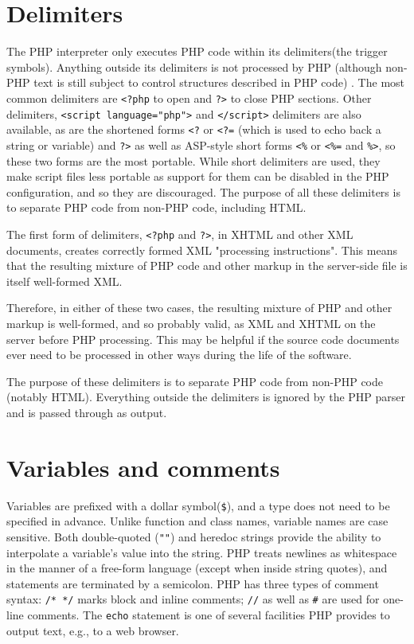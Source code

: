 \section{Delimiters}



The PHP interpreter only executes PHP code within its delimiters(the trigger symbols). Anything outside its delimiters is not processed by PHP (although non-PHP text is still subject to control structures described in PHP code) . The most common delimiters are \texttt{<?php} to open and \texttt{?>} to close PHP sections.  Other delimiters, \texttt{<script language="php">} and \texttt{</script>} delimiters are also available, as are the shortened forms \texttt{<?} or \texttt{<?=} (which is used to echo back a string or variable) and \texttt{?>} as well as ASP-style short forms \texttt{<\%} or \texttt{<\%=} and \texttt{\%>}, so these two forms are the most portable. While short delimiters are used, they make script files less portable as support for them can be disabled in the PHP configuration, and so they are discouraged. The purpose of all these delimiters is to separate PHP code from non-PHP code, including HTML.



The first form of delimiters, \texttt{<?php} and \texttt{?>}, in XHTML and other XML documents, creates correctly formed XML "processing instructions". This means that the resulting mixture of PHP code and other markup in the server-side file is itself well-formed XML.

Therefore, in either of these two cases, the resulting mixture of PHP and other markup is well-formed, and so probably valid, as XML and XHTML on the server before PHP processing. This may be helpful if the source code documents ever need to be processed in other ways during the life of the software.

The purpose of these delimiters is to separate PHP code from non-PHP code (notably HTML). Everything outside the delimiters is ignored by the PHP parser and is passed through as output.



\section{Variables and comments}





Variables are prefixed with a dollar symbol(\texttt{\$}), and a type does not need to be specified in advance. Unlike function and class names, variable names are case sensitive. Both double-quoted (\texttt{""}) and heredoc strings provide the ability to interpolate a variable's value into the string. PHP treats newlines as whitespace in the manner of a free-form language (except when inside string quotes), and statements are terminated by a semicolon. PHP has three types of comment syntax: \texttt{/* */} marks block and inline comments; \texttt{//} as well as \texttt{\#} are used for one-line comments. The \texttt{echo} statement is one of several facilities PHP provides to output text, e.g., to a web browser.



